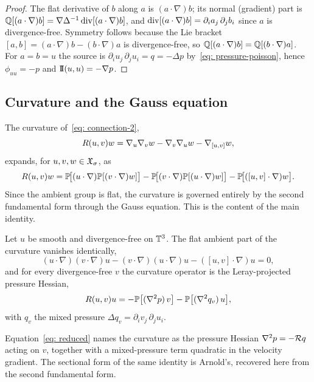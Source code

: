 \begin{proof}
The flat derivative of $b$ along $a$ is $(a\cdot\nabla)b$; its normal
(gradient) part is $\mathbb{Q}[(a\cdot\nabla)b] = \nabla\Delta^{-1}\operatorname{div}[(a\cdot\nabla)b]$,
and $\operatorname{div}[(a\cdot\nabla)b] = \partial_i a_j\,\partial_j b_i$ since $a$ is
divergence-free. Symmetry follows because the Lie bracket
$[a,b] = (a\cdot\nabla)b - (b\cdot\nabla)a$ is divergence-free, so
$\mathbb{Q}[(a\cdot\nabla)b] = \mathbb{Q}[(b\cdot\nabla)a]$. For $a = b = u$ the source is
$\partial_i u_j\,\partial_j u_i = q = -\Delta p$ by~\eqref{eq: pressure-poisson},
hence $\phi_{uu} = -p$ and $\mathrm{I\!I}(u,u) = -\nabla p$.
\end{proof}

\subsection{Curvature and the Gauss equation}

The curvature of~\eqref{eq: connection-2},
\[
  R(u,v)w = \nabla_u\nabla_v w - \nabla_v\nabla_u w - \nabla_{[u,v]} w,
\]
expands, for $u, v, w \in \mathfrak{X}_\sigma$, as
\begin{equation}\label{eq: curvature-formula}
  R(u,v)w
  = \mathbb{P}\!\bigl[(u\cdot\nabla)\mathbb{P}[(v\cdot\nabla)w]\bigr]
  - \mathbb{P}\!\bigl[(v\cdot\nabla)\mathbb{P}[(u\cdot\nabla)w]\bigr]
  - \mathbb{P}\!\bigl[([u,v]\cdot\nabla)w\bigr].
\end{equation}
Since the ambient group is flat, the curvature is governed entirely by the second
fundamental form through the Gauss equation. This is the content of the main
identity.

\begin{theorem}\label{thm: main}
Let $u$ be smooth and divergence-free
on $\mathbb{T}^3$. The flat ambient part of the curvature vanishes identically,
\begin{equation}\label{eq: local-zero}
  (u\cdot\nabla)(v\cdot\nabla)u - (v\cdot\nabla)(u\cdot\nabla)u
  - ([u,v]\cdot\nabla)u = 0,
\end{equation}
and for every divergence-free $v$ the curvature operator is the Leray-projected
pressure Hessian,
\begin{equation}\label{eq: reduced}
  R(u,v)u = -\mathbb{P}\bigl[(\nabla^2 p)\,v\bigr]
              - \mathbb{P}\bigl[(\nabla^2 q_v)\,u\bigr],
\end{equation}
with $q_v$ the mixed pressure $\Delta q_v = \partial_i v_j\,\partial_j u_i$.
\end{theorem}

Equation~\eqref{eq: reduced} names the curvature as the pressure Hessian
$\nabla^2 p = -\mathcal{R} q$ acting on $v$, together with a mixed-pressure term
quadratic in the velocity gradient. The sectional form of the same identity is
Arnold's, recovered here from the second fundamental form.

